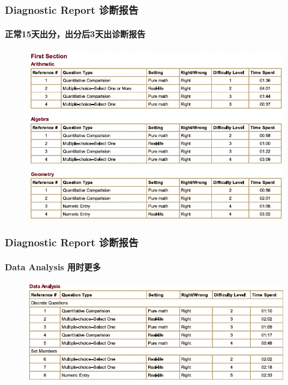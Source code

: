 \documentclass[
	11pt, %
]{beamer}
\begin{document}
\begin{frame}
	\frametitle{Diagnostic Report 诊断报告}
	\framesubtitle{正常15天出分，出分后3天出诊断报告}
	
	\begin{figure}
		\includegraphics[width=0.9\linewidth]{Diagnostic_Report_Section1_1.png}
	\end{figure}
\end{frame}


\begin{frame}
	\frametitle{Diagnostic Report 诊断报告}
	\framesubtitle{Data Analysis 用时更多}
	
	\begin{figure}
		\includegraphics[width=0.9\linewidth]{Diagnostic_Report_Section1_2.png}
	\end{figure}
\end{frame}

\end{document}
